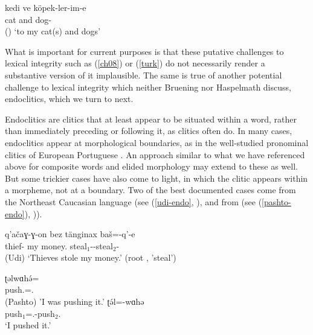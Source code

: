 \documentclass[output=paper
 	        ,biblatex
                ,babelshorthands
                ,newtxmath
                ,draftmode
                ,colorlinks, citecolor=brown
]{langscibook}
\begin{document}
\ea
\label{turk}
\gll kedi ve köpek-ler-im-e \\
     cat and dog- \\\hfill()
\glt `to my cat(s) and dogs'	
\z

What is important for current purposes is that these putative challenges to lexical integrity such as (\ref{ch08}) or (\ref{turk}) do not necessarily render a substantive version of it implausible. The same is true of another potential challenge to lexical integrity which neither Bruening nor Haspelmath discuss, endoclitics, which we turn to next.

Endoclitics are clitics that at least appear to be situated within a word, rather than immediately
preceding or following it, as clitics often do.
In many cases, endoclitics appear at morphological boundaries, as in the well-studied pronominal clitics of European Portuguese \citep{Crysmann2000a}. An approach similar to what we have referenced above for composite words and elided morphology may extend to these as well. But some trickier cases have also come to light, in which the clitic appears within a morpheme, not at a boundary. Two of the best documented cases come from the Northeast Caucasian language  \citep{Harris2000} (see (\ref{udi-endo}, \citealt[599]{Harris2000}), and from  \citep{Tegey1977,Roberts2000,Dost2007} (see (\ref{pashto-endo}), \citealt[92]{Tegey1977})).

\ea
\label{udi-endo}
\gll q'a\v{c}aɣ-ɣ-on bez t\"{a}nginax ba\v{s}=-q'-e\footnotemark\\
     thief- my money. steal$_{1}$--steal$_{2}$- \\\hfill(Udi)
\glt `Thieves stole my money.' (root , 'steal') 
\z

\eal
\label{pashto-endo}
\ex\label{pashto-endo-a}
\gll ʈəlwɑhə́=\footnotemark \\
     push.=. \\\hfill(Pashto)
\glt 'I was pushing it.'
\ex\label{pashto-endo-b}
\gll ʈə́l=-wɑhə\footnotemark \\
     push$_{1}$=.-push$_{2}$. \\
\glt `I pushed it.'
\zl
\end{document}

